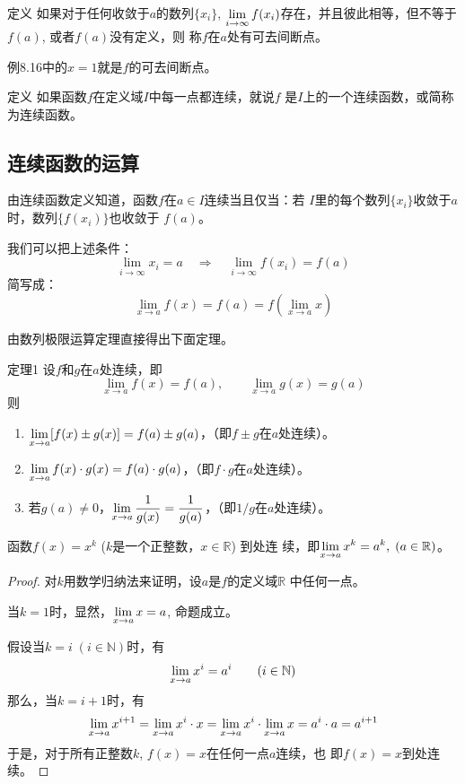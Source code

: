 \begin{blk}{定义}
     如果对于任何收敛于$a$的数列$\{x_i\}$, $\displaystyle\lim_{i\to\infty}f(x_i)$存在，并且彼此相等，但不等于$f(a)$, 或者$f(a)$没有定义，则
称$f$在$a$处有可去间断点。
\end{blk}

例8.16中的$x=1$就是$f$的可去间断点。

\begin{blk}{定义}
    如果函数$f$在定义域$I$中每一点都连续，就说$f$
是$I$上的一个连续函数，或简称为连续函数。
\end{blk}

\subsection{连续函数的运算}
由连续函数定义知道，函数$f$在$a\in I$连续当且仅当：若
$I$里的每个数列$\{x_i\}$收敛于$a$时，数列$\{f(x_i)\}$也收敛于
$f(a)$。

我们可以把上述条件：
\[\lim_{i\to \infty}x_i=a \quad \Longrightarrow\quad \lim_{i\to \infty}f(x_i)=f(a)\]
简写成：
\[\lim_{x\to a}f(x)=f(a)=f\left(\lim_{x\to a}x\right)\]

由数列极限运算定理直接得出下面定理。

\begin{blk}{定理1}
    设$f$和$g$在$a$处连续，即
    \[\lim_{x\to a}f(x)=f(a),\qquad \lim_{x\to a}g(x)=g(a)\]
    则
\begin{enumerate}
    \item $\displaystyle\lim_{x\to a}[f(x)\pm g(x)]=f(a)\pm g(a)$，（即$f\pm g$在$a$处连续）。
    \item $\displaystyle\lim_{x\to a}f(x)\cdot g(x)=f(a)\cdot g(a)$，（即$f\cdot g$在$a$处连续）。
    \item 若$g(a)\ne 0$，$\displaystyle\lim_{x\to a}\dfrac{1}{g(x)}=\dfrac{1}{g(a)}$，（即$1/g$在$a$处连续）。
\end{enumerate}
\end{blk}

\begin{example}
    函数$f(x)=x^k$ ($k$是一个正整数，$x\in\mathbb{R}$) 到处连
续，即$\displaystyle\lim_{x\to a}x^k=a^k,\; (a\in\mathbb{R})$。
\end{example}

\begin{proof}
对$k$用数学归纳法来证明，设$a$是$f$的定义域$\mathbb{R}$
中任何一点。

当$k=1$时，显然，$\displaystyle\lim_{x\to a}x=a$, 命题成立。

假设当$k=i\; (i\in\mathbb{N})$时，有
\[\displaystyle\lim_{x\to a} x^i=a^i\qquad (i\in\mathbb{N})\]
那么，当$k=i+1$时，有
\[\displaystyle\lim_{x\to a}x^{i+1}=\displaystyle\lim_{x\to a} x^i\cdot x=\displaystyle\lim_{x\to a} x^i\cdot \displaystyle\lim_{x\to a} x=a^i\cdot a=a^{i+1}\]    
于是，对于所有正整数$k$, $f(x)=x$在任何一点$a$连续，也
即$f(x)=x$到处连续。
\end{proof}


